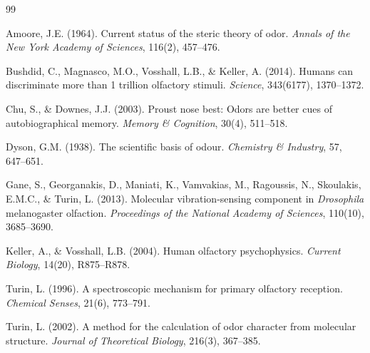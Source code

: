 \documentclass[11pt]{article}
\theoremstyle{remark}
\begin{document}

\begin{thebibliography}{99}

Amoore, J.E. (1964). Current status of the steric theory of odor. \textit{Annals of the New York Academy of Sciences}, 116(2), 457--476.

Bushdid, C., Magnasco, M.O., Vosshall, L.B., \& Keller, A. (2014). Humans can discriminate more than 1 trillion olfactory stimuli. \textit{Science}, 343(6177), 1370--1372.

Chu, S., \& Downes, J.J. (2003). Proust nose best: Odors are better cues of autobiographical memory. \textit{Memory \& Cognition}, 30(4), 511--518.

Dyson, G.M. (1938). The scientific basis of odour. \textit{Chemistry \& Industry}, 57, 647--651.

Gane, S., Georganakis, D., Maniati, K., Vamvakias, M., Ragoussis, N., Skoulakis, E.M.C., \& Turin, L. (2013). Molecular vibration-sensing component in \textit{Drosophila} melanogaster olfaction. \textit{Proceedings of the National Academy of Sciences}, 110(10), 3685--3690.

Keller, A., \& Vosshall, L.B. (2004). Human olfactory psychophysics. \textit{Current Biology}, 14(20), R875--R878.

Turin, L. (1996). A spectroscopic mechanism for primary olfactory reception. \textit{Chemical Senses}, 21(6), 773--791.

Turin, L. (2002). A method for the calculation of odor character from molecular structure. \textit{Journal of Theoretical Biology}, 216(3), 367--385.

\end{thebibliography}
\end{document}
